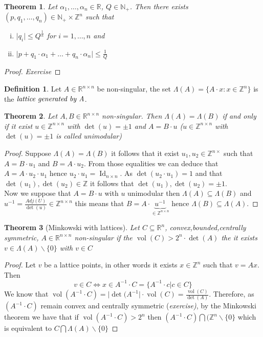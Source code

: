 \documentclass[a4paper,11pt,american]{article}
\newcommand{\N}{\mathbb{N}}
\newcommand{\R}{\mathbb{R}}
\newcommand{\Z}{\mathbb{Z}}
\DeclareMathOperator{\vol}{vol}
\DeclareMathOperator{\Id}{Id}
\theoremstyle{plain}
\newtheorem{theorem}{Theorem}
\theoremstyle{definition}
\newtheorem{definition}{Definition}
\begin{document}
\begin{theorem}
    Let $\alpha_1,\dots,\alpha_n\in\R$, $Q\in\N_+$. Then there exists $(p,q_1,\dots,q_n)\in\N_+\times\Z^n$ such that
    \begin{enumerate}[i)]
        \item $\vert q_i\vert\leq Q^{\frac{1}{n}}$ for $i=1,\dots,n$ and
        \item $\vert p+q_1\cdot\alpha_1+\dots +q_n\cdot\alpha_n \vert\leq \frac{1}{Q}$
    \end{enumerate}
\end{theorem}
\begin{proof}
    \emph{Exercise}
\end{proof}
\begin{definition}
    Let $A\in\R^{n\times n}$ be non-singular, the set $\Lambda(A)=\{A\cdot x:x\in\Z^n\}$ is the $\emph{lattice generated by A}$.
\end{definition}
\begin{theorem}
    Let $A,B\in\R^{n\times n}$ non-singular. Then $\Lambda(A)=\Lambda(B)$ \emph{if and only if} it exist $u\in\Z^{n \times n}$ with $\det(u)=\pm 1$ and $A=B\cdot u$ ($u\in\Z^{n \times n}$ with $\det(u)=\pm 1$ is called \emph{unimodular})
\end{theorem}
\begin{proof}
    Suppose $\Lambda(A)=\Lambda(B)$ it follows that it exist $u_1,u_2\in \Z^{n\times }$ such that $A=B\cdot u_1$ and $B=A\cdot u_2$. From those equalities we can deduce that $A=A\cdot u_2\cdot u_1$ hence $u_2\cdot u_1=\Id_{n\times n}$. As $\det (u_2\cdot u_1)=1$ and that $\det(u_1),\det(u_2)\in\Z$ it follows that $\det(u_1),\det(u_2)=\pm 1$.\\
    Now we suppose that $A=B\cdot u$ with $u$ unimodular then $\Lambda(A)\subseteq\Lambda (B)$ and $u^{-1}=\frac{Adj(U)}{\det(u)}\in \Z^{n\times n}$ this means that $B=A\cdot \underbrace{u^{-1}}_{\in\Z^{n\times n}}$ hence $\Lambda(B)\subseteq \Lambda(A)$.
\end{proof}
\begin{theorem}[Minkowski with lattices]
Let $C\subseteq \R^n$, convex,bounded,centrally symmetric, $A\in\R^{n \times n}$ non-singular if the $\vol(C)>2^n\cdot\det(A)$ the it exists $v\in\Lambda(A)\backslash\{0\}$ with $v\in C$
\end{theorem}
\begin{proof}
    Let $v$ be a lattice points, in other words it exists $x\in\Z^n$ such that $v=Ax$. Then $$v\in C\iff x\in A^{-1}\cdot C= \{A^{-1}\cdot c\vert c\in C\}$$
   We know that $\vol(A^{-1}\cdot C)=\vert \det(A^{-1}\vert\cdot\vol(C)=\frac{
\vol(C)}{\det(A)}$. Therefore, as $(A^{-1}\cdot C)$ remain convex and centrally symmetric (\emph{exercise)}, by the Minkowski theorem we have that if $\vol (A^{-1}\cdot C)> 2^n$ then $(A^{-1}\cdot C)\bigcap(\Z^n\backslash\{0\}$ which is equivalent to $C\bigcap\Lambda(A)\backslash\{0\}$
\end{proof}
\end{document}
